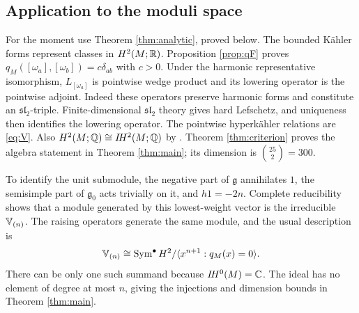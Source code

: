 \subsection{Application to the moduli space}
For the moment use Theorem \ref{thm:analytic}, proved below.
The bounded K\"ahler forms represent classes in $H^2(M;\mathbb R)$.
Proposition \ref{prop:qF} proves
$q_M([\omega_a],[\omega_b])=c\delta_{ab}$ with $c>0$.
Under the harmonic representative isomorphism, $L_{[\omega_a]}$
is pointwise wedge product and its lowering operator is the
pointwise adjoint. Indeed these operators preserve harmonic forms
and constitute an $\mathfrak{sl}_2$-triple. Finite-dimensional
$\mathfrak{sl}_2$ theory gives hard Lefschetz, and uniqueness then
identifies the lowering operator. The pointwise hyperk\"ahler
relations are \eqref{eq:V}. Also
$H^2(M;\mathbb Q)\cong I\!H^2(M;\mathbb Q)$ by
\cite[Proposition~2.17]{tighe22}. Theorem \ref{thm:criterion}
proves the algebra statement in Theorem \ref{thm:main}; its
dimension is $\binom{25}{2}=300$.

To identify the unit submodule, the negative part of $\mathfrak g$
annihilates $1$, the semisimple part of $\mathfrak g_0$ acts
trivially on it, and $h1=-2n$. Complete reducibility shows that a
module generated by this lowest-weight vector is the irreducible
$\mathbb V_{(n)}$. The raising operators generate the same module, and
the usual description \cite[Proposition~2.14]{ll97} is
\begin{equation}\label{eq:verbitsky-component}
 \mathbb V_{(n)}\cong
 \operatorname{Sym}^\bullet H^2/\langle x^{n+1}:q_M(x)=0\rangle.
\end{equation}
There can be only one such summand because $I\!H^0(M)=\mathbb C$.
The ideal has no element of degree at most $n$, giving the
injections and dimension bounds in Theorem \ref{thm:main}.
